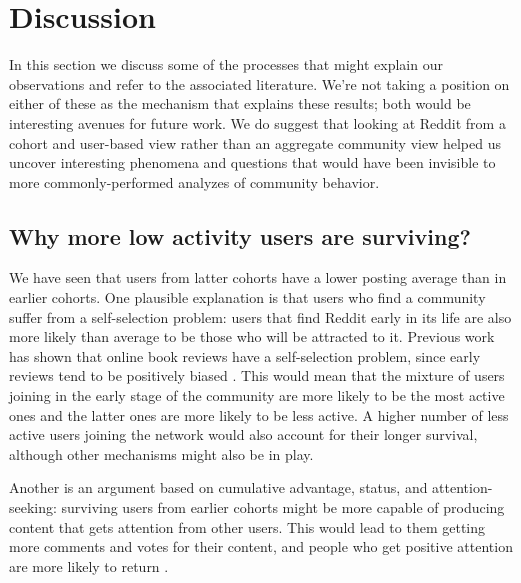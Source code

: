 \section{Discussion}

In this section we discuss some of the processes that might explain our observations and refer to the associated literature. We're not taking a position on either of these as the mechanism that explains these results; both would be interesting avenues for future work.  We do suggest that looking at Reddit from a cohort and user-based view rather than an aggregate community view helped us uncover interesting phenomena and questions that would have been invisible to more commonly-performed analyzes of community behavior. 

\subsection{Why more low activity users are surviving?}

We have seen that users from latter cohorts have a lower posting average than in earlier cohorts. 
One plausible explanation is that users who find a community suffer from a self-selection problem: users that find Reddit early in its life are also more likely than average to be those who will be attracted to it. Previous work has shown that online book reviews have a self-selection problem, since early reviews tend to be positively biased \cite{Li2008}. This would mean that the mixture of users joining in the early stage of the community are more likely to be the most active ones and the latter ones are more likely to be less active. A higher number of less active users joining the network would also account for their longer survival, although other mechanisms might also be in play.

Another is an argument based on cumulative advantage, status, and attention-seeking: surviving users from earlier cohorts might be more capable of producing content that gets attention from other users.  This would lead to them getting more comments and votes for their content, and people who get positive attention are more likely to return \cite{Halfaker2009, Choi2010, Sarkar2012}.  

